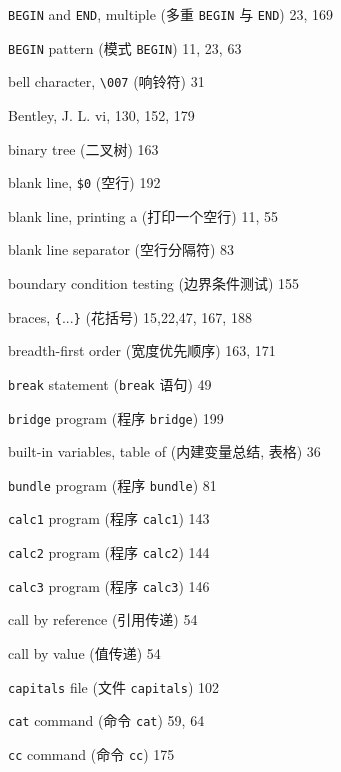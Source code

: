 \begin{multicols}{2}
\hangindent=2pc  \verb'BEGIN' and \verb'END', multiple (多重
\verb'BEGIN' 与 \verb'END') 23, 169

\hangindent=2pc  \verb'BEGIN' pattern (模式 \verb'BEGIN') 11, 23, 63

\hangindent=2pc  bell character, \verb'\007' (响铃符) 31

\hangindent=2pc  Bentley, J. L. vi, 130, 152, 179

\hangindent=2pc  binary tree (二叉树) 163

\hangindent=2pc  blank line, \verb'$0' (空行) 192

\hangindent=2pc  blank line, printing a (打印一个空行) 11, 55

\hangindent=2pc  blank line separator (空行分隔符) 83

\hangindent=2pc  boundary condition testing (边界条件测试) 155

\hangindent=2pc  braces, \verb'{'...\verb'}' (花括号) 15,22,47, 167, 188

\hangindent=2pc  breadth-first order (宽度优先顺序) 163, 171

\hangindent=2pc  \verb'break' statement (\verb'break' 语句) 49

\hangindent=2pc  \verb'bridge' program (程序 \verb'bridge') 199

\hangindent=2pc  built-in variables, table of (内建变量总结, 
表格) 36

\hangindent=2pc  \verb'bundle' program (程序 \verb'bundle') 81

\hangindent=2pc  \verb'calc1' program (程序 \verb'calc1') 143

\hangindent=2pc  \verb'calc2' program (程序 \verb'calc2') 144

\hangindent=2pc  \verb'calc3' program (程序 \verb'calc3') 146

\hangindent=2pc  call by reference (引用传递) 54

\hangindent=2pc  call by value (值传递) 54

\hangindent=2pc  \verb'capitals' file (文件 \verb'capitals') 102

\hangindent=2pc  \verb'cat' command (命令 \verb'cat') 59, 64

\hangindent=2pc  \verb'cc' command (命令 \verb'cc') 175


\end{multicols}

